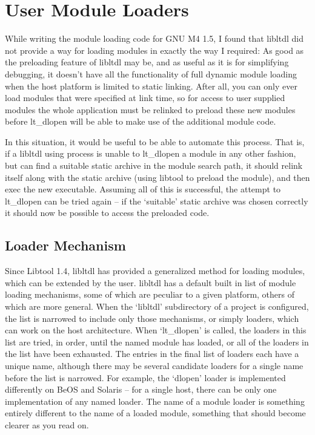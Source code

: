 \section{User Module Loaders}

While writing the module loading code for GNU M4 1.5, I found that libltdl did not provide a way for loading modules in exactly the way I required: As good as the preloading feature of libltdl may be, and as useful as it is for simplifying debugging, it doesn't have all the functionality of full dynamic module loading when the host platform is limited to static linking. After all, you can only ever load modules that were specified at link time, so for access to user supplied modules the whole application must be relinked to preload these new modules before lt\_{}dlopen will be able to make use of the additional module code.

In this situation, it would be useful to be able to automate this process. That is, if a libltdl using process is unable to lt\_{}dlopen a module in any other fashion, but can find a suitable static archive in the module search path, it should relink itself along with the static archive (using libtool to preload the module), and then exec the new executable. Assuming all of this is successful, the attempt to lt\_{}dlopen can be tried again -- if the `suitable' static archive was chosen correctly it should now be possible to access the preloaded code. 

\subsection{Loader Mechanism}

Since Libtool 1.4, libltdl has provided a generalized method for loading modules, which can be extended by the user. libltdl has a default built in list of module loading mechanisms, some of which are peculiar to a given platform, others of which are more general. When the `libltdl' subdirectory of a project is configured, the list is narrowed to include only those mechanisms, or simply loaders, which can work on the host architecture. When `lt\_{}dlopen' is called, the loaders in this list are tried, in order, until the named module has loaded, or all of the loaders in the list have been exhausted. The entries in the final list of loaders each have a unique name, although there may be several candidate loaders for a single name before the list is narrowed. For example, the `dlopen' loader is implemented differently on BeOS and Solaris -- for a single host, there can be only one implementation of any named loader. The name of a module loader is something entirely different to the name of a loaded module, something that should become clearer as you read on.

